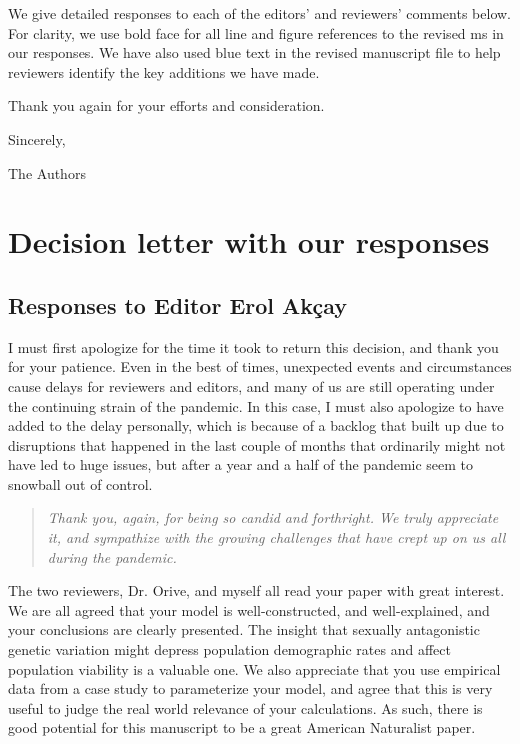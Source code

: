 \documentclass[11pt]{article}
\begin{document}
\noindent We give detailed responses to each of the editors' and reviewers' comments below. For clarity, we use bold face for all line and figure references to the revised ms in our responses. We have also used blue text in the revised manuscript file to help reviewers identify the key additions we have made.
\bigskip

\noindent Thank you again for your efforts and consideration.
\bigskip

\noindent Sincerely,

\noindent The Authors \\
\noindent\makebox[\linewidth]{\rule{\textwidth}{0.4pt}}
\smallskip


\section*{Decision letter with our responses}

\subsection*{Responses to Editor Erol Ak\c{c}ay}


I must first apologize for the time it took to return this decision, and thank you for your patience. Even in the best of times, unexpected events and circumstances cause delays for reviewers and editors, and many of us are still operating under the continuing strain of the pandemic. In this case, I must also apologize to have added to the delay personally, which is because of a backlog that built up due to disruptions that happened in the last couple of months that ordinarily might not have led to huge issues, but after a year and a half of the pandemic seem to snowball out of control.

\begin{quote}
	{\itshape Thank you, again, for being so candid and forthright. We truly appreciate it, and sympathize with the growing challenges that have crept up on us all during the pandemic.}
\end{quote}


The two reviewers, Dr. Orive, and myself all read your paper with great interest. We are all agreed that your model is well-constructed, and well-explained, and your conclusions are clearly presented. The insight that sexually antagonistic genetic variation might depress population demographic rates and affect population viability is a valuable one. We also appreciate that you use empirical data from a case study to parameterize your model, and agree that this is very useful to judge the real world relevance of your calculations. As such, there is good potential for this manuscript to be a great American Naturalist paper.
\end{document}
